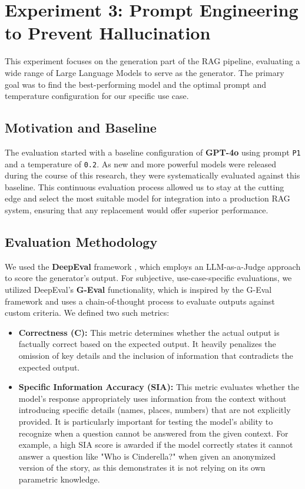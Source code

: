 \section{Experiment 3: Prompt Engineering to Prevent Hallucination}
\label{sec:exp_generator_prompt}
This experiment focuses on the generation part of the RAG pipeline, evaluating a wide range of Large Language Models to serve as the generator. The primary goal was to find the best-performing model and the optimal prompt and temperature configuration for our specific use case.

\subsection{Motivation and Baseline}
The evaluation started with a baseline configuration of \textbf{GPT-4o} using prompt \texttt{P1} and a temperature of \texttt{0.2}. As new and more powerful models were released during the course of this research, they were systematically evaluated against this baseline. This continuous evaluation process allowed us to stay at the cutting edge and select the most suitable model for integration into a production RAG system, ensuring that any replacement would offer superior performance.

\subsection{Evaluation Methodology}
We used the \textbf{DeepEval} framework \autocite{deepeval2023}, which employs an LLM-as-a-Judge approach to score the generator's output. For subjective, use-case-specific evaluations, we utilized DeepEval's \textbf{G-Eval} functionality, which is inspired by the G-Eval framework \autocite{liu2023geval} and uses a chain-of-thought process to evaluate outputs against custom criteria. We defined two such metrics:
\begin{itemize}
    \item \textbf{Correctness (C):} This metric determines whether the actual output is factually correct based on the expected output. It heavily penalizes the omission of key details and the inclusion of information that contradicts the expected output.
    \item \textbf{Specific Information Accuracy (SIA):} This metric evaluates whether the model's response appropriately uses information from the context without introducing specific details (names, places, numbers) that are not explicitly provided. It is particularly important for testing the model's ability to recognize when a question cannot be answered from the given context. For example, a high SIA score is awarded if the model correctly states it cannot answer a question like "Who is Cinderella?" when given an anonymized version of the story, as this demonstrates it is not relying on its own parametric knowledge.
\end{itemize}

